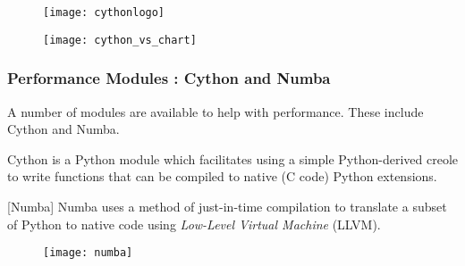  \begin{figure}

\texttt{[image: cythonlogo]}

\end{figure}

\begin{figure}
\centering
\texttt{[image: cython\_vs\_chart]}

\end{figure}

 
 
 
  
\frametitle{Performance Modules : Cython and Numba}
A number of modules are available to help with performance. These include Cython and Numba.

\begin{description}
 [Cython] Cython
 is a Python module which facilitates using a simple Python-derived creole to write functions that can be
 compiled to native (C code) Python extensions. 
 
 
 [Numba] 
 Numba uses a method of just-in-time compilation to
 translate a subset of Python to native code using \textit{Low-Level Virtual Machine} (LLVM).
\end{description} 

 
 
 \begin{figure}
\centering
\texttt{[image: numba]}

\end{figure}